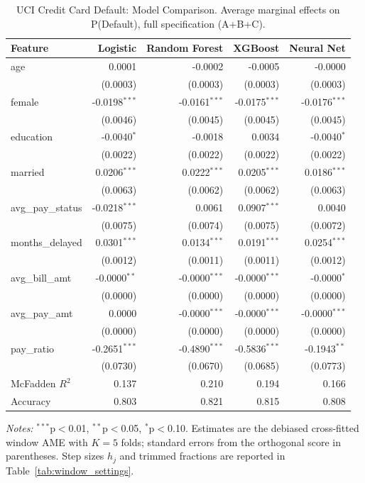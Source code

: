 \documentclass[12pt]{article}
\begin{document}
	\begin{table}[htbp]
		\centering
		\small
		\begin{threeparttable}
			\caption{UCI Credit Card Default: Model Comparison. Average marginal effects on P(Default), full specification (A+B+C).}
			\label{tab:credit_default_model_comparison}
			\begin{tabular}{lrrrr}
				\toprule
				Feature & Logistic & Random Forest & XGBoost & Neural Net \\
				\midrule
				age & 0.0001 & -0.0002 & -0.0005 & -0.0000 \\
				& (0.0003) & (0.0003) & (0.0003) & (0.0003) \\
				female & -0.0198$^{***}$ & -0.0161$^{***}$ & -0.0175$^{***}$ & -0.0176$^{***}$ \\
				& (0.0046) & (0.0045) & (0.0045) & (0.0045) \\
				education & -0.0040$^{*}$ & -0.0018 & 0.0034 & -0.0040$^{*}$ \\
				& (0.0022) & (0.0022) & (0.0022) & (0.0022) \\
				married & 0.0206$^{***}$ & 0.0222$^{***}$ & 0.0205$^{***}$ & 0.0186$^{***}$ \\
				& (0.0063) & (0.0062) & (0.0062) & (0.0063) \\
				\midrule
				avg\_pay\_status & -0.0218$^{***}$ & 0.0061 & 0.0907$^{***}$ & 0.0040 \\
				& (0.0075) & (0.0074) & (0.0075) & (0.0072) \\
				months\_delayed & 0.0301$^{***}$ & 0.0134$^{***}$ & 0.0191$^{***}$ & 0.0254$^{***}$ \\
				& (0.0012) & (0.0011) & (0.0011) & (0.0012) \\
				\midrule
				avg\_bill\_amt & -0.0000$^{**}$ & -0.0000$^{***}$ & -0.0000$^{***}$ & -0.0000$^{*}$ \\
				& (0.0000) & (0.0000) & (0.0000) & (0.0000) \\
				avg\_pay\_amt & 0.0000 & -0.0000$^{***}$ & -0.0000$^{***}$ & -0.0000$^{***}$ \\
				& (0.0000) & (0.0000) & (0.0000) & (0.0000) \\
				pay\_ratio & -0.2651$^{***}$ & -0.4890$^{***}$ & -0.5836$^{***}$ & -0.1943$^{**}$ \\
				& (0.0730) & (0.0670) & (0.0685) & (0.0773) \\
				\midrule
				McFadden $R^2$ & 0.137 & 0.210 & 0.194 & 0.166 \\
				Accuracy & 0.803 & 0.821 & 0.815 & 0.808 \\
				\bottomrule
				\end{tabular}
				\begin{tablenotes}
				\footnotesize
				\item \textit{Notes:} $^{***}$p$<$0.01, $^{**}$p$<$0.05, $^{*}$p$<$0.10. Estimates are the debiased cross-fitted window AME with $K=5$ folds; standard errors from the orthogonal score in parentheses. Step sizes $h_j$ and trimmed fractions are reported in Table~\ref{tab:window_settings}.
				\end{tablenotes}
		\end{threeparttable}
	\end{table}
	
\end{document}
